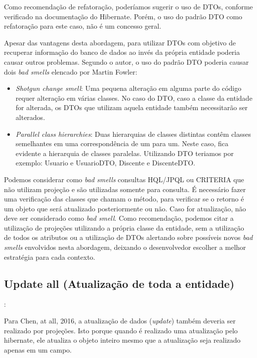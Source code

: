 Como recomendação de refatoração, poderíamos sugerir o uso de DTOs, conforme verificado na documentação do Hibernate. Porém, o uso do padrão DTO como refatoração para este caso, não é um concesso geral. 

Apesar das vantagens desta abordagem, para \cite{bauer2005hibernate} utilizar DTOs com objetivo de recuperar informação do banco de dados ao invés da própria entidade poderia causar outros problemas. Segundo o autor, o uso do padrão DTO poderia causar dois \textit{bad smells} elencado por Martin Fowler:

\begin{itemize}
    \item \textit{Shotgun change smell}: Uma pequena alteração em alguma parte do código requer alteração em várias classes. No caso do DTO, caso a classe da entidade for alterada, os DTOs que utilizam aquela entidade também necessitarão ser alterados.
    \item \textit{Parallel class hierarchies}: Duas hierarquias de classes distintas contêm classes semelhantes em uma correspondência de um para um. Neste caso, fica evidente a hierarquia de classes paralelas. Utilizando DTO teriamos por exemplo: Usuario e UsuarioDTO, Discente e DiscenteDTO.
\end{itemize}

Podemos considerar como \textit{bad smells} consultas HQL/JPQL ou CRITERIA que não utilizam projeção e são utilizadas somente para consulta. É necessário fazer uma verificação das classes que chamam o método, para verificar se o retorno é um objeto que será atualizado posteriormente ou não. Caso for atualização, não deve ser considerado como \textit{bad smell}. Como recomendação, podemos citar a utilização de projeções utilizando a própria classe da entidade, sem a utilização de todos os atributos ou a utilização de DTOs alertando sobre possíveis novos \textit{bad smells} envolvidos nesta abordagem, deixando o desenvolvedor escolher a melhor estratégia para cada contexto.


\subsection{Update all (Atualização de toda a entidade)}:

Para Chen, at all, 2016, a atualização de dados (\textit{update}) também deveria ser realizado por projeções. Isto porque quando é realizado uma atualização pelo hibernate, ele atualiza o objeto inteiro mesmo que a atualização seja realizado apenas em um campo.

